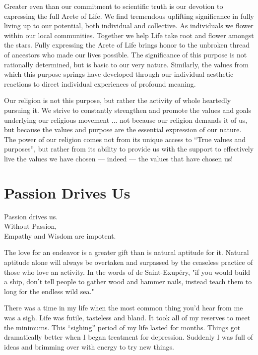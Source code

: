 \documentclass[ebook,12pt,openany,twoside]{memoir}
\newcommand{\tab}{\hspace*{2em}}
\newcommand{\imagefacingchapter}[1]{
  \cleartoverso
  \clearpage \null
  \thispagestyle{cleared}
  \AddToShipoutPictureBG*{%
    \AtStockLowerLeft{%
      \texttt{[image: \#1]}
    }
  }
  \clearpage
}
\begin{document}
Greater even than our commitment to scientific truth is our devotion to expressing the full Arete of Life. We find tremendous uplifting significance in fully living up to our
potential, both individual and collective. As individuals we flower within our
local communities. Together we help Life take root and flower amongst the
stars. Fully expressing the Arete of Life brings honor to the unbroken thread
of ancestors who made our lives possible. The significance of this purpose is not rationally determined, but is basic to
our very nature. Similarly, the values from which this purpose springs have developed through our individual aesthetic reactions to direct individual experiences of profound meaning.

Our religion is not this purpose, but rather the activity of whole heartedly pursuing it. We strive to constantly
strengthen and promote the values and goals underlying our religious movement
... not because our religion demands it of us, but because the values and
purpose are the essential expression of our nature. The power of our religion comes not from its unique access to ``True values and
purposes'', but rather from its ability to provide us with the support to
effectively live the values we have chosen --- indeed --- the values that
have chosen us!



\imagefacingchapter{images/PassionDrives}
\chapter{Passion Drives Us}
\setlength\epigraphwidth{2.8in}
\epigraph{
  Passion drives us.\\
  Without Passion,\\
  \tab Empathy and Wisdom are impotent.
}{}

\noindent The love for an endeavor is a greater gift than is natural aptitude for it.
Natural aptitude alone will always be overtaken and surpassed by the ceaseless
practice of those who love an activity. In the words of de Saint-Exup\'{e}ry,
"if you would build a ship, don't tell people to gather wood and hammer nails,
instead teach them to long for the endless wild sea."

There was a time in my life when the most common thing you'd hear
from me was a sigh. Life was futile, tasteless and bland. It took all of my
reserves to meet the minimums. This ``sighing'' period of my life lasted for
months. Things got dramatically better when I began treatment for depression.
Suddenly I was full of ideas and brimming over with energy to try new things.
\end{document}

